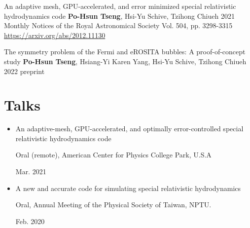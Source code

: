\documentclass[%
               doublesided,
               paper=a4,
               fontsize=10pt
              ]{resume}
\begin{document}
\publication
	{An adaptive mesh, GPU-accelerated,
         and error minimized special relativistic hydrodynamics code} %
	{\textbf{Po-Hsun Tseng}, Hsi-Yu Schive, Tzihong Chiueh} %
	{2021} %
	{Monthly Notices of the Royal Astronomical Society Vol. 504, pp. 3298-3315\\ %
        \url{https://arxiv.org/abs/2012.11130}} %
       {
        } %

\publication
	{The symmetry problem of the Fermi and eROSITA bubbles: A proof-of-concept study}
	{\textbf{Po-Hsun Tseng}, Hsiang-Yi Karen Yang, Hsi-Yu Schive, Tzihong Chiueh} %
	{2022} %
	{preprint}\\ %




\section{Talks}
\begin{itemize}
\item
          An adaptive-mesh, GPU-accelerated, and optimally error-controlled
          special relativistic hydrodynamics code\\
          \begin{minipage}{6in}
       	  Oral (remote), American Center for Physics College Park, U.S.A
          \end{minipage}
          \hfill
          \begin{minipage}{1in}
          Mar. 2021
          \end{minipage}
\item
          A new and accurate code for simulating special relativistic hydrodynamics\\
          \begin{minipage}{6in}
          Oral, Annual Meeting of the Physical Society of Taiwan, NPTU.
          \end{minipage}
          \hfill
          \begin{minipage}{1in}
          Feb. 2020
          \end{minipage}
\end{itemize}
\end{document}
